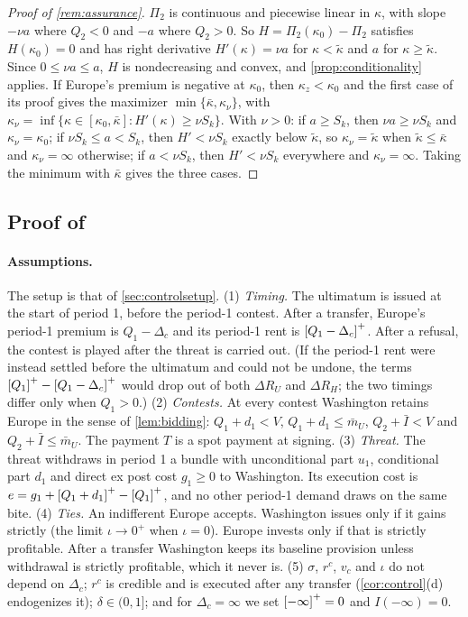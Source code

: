 \begin{proof}[Proof of \cref{rem:assurance}]
$\Pi_2$ is continuous and piecewise linear in $\kappa$, with slope $-\nu a$ where $Q_2<0$ and $-a$ where $Q_2>0$. So $H=\Pi_2(\kappa_0)-\Pi_2$ satisfies $H(\kappa_0)=0$ and has right derivative $H'(\kappa)=\nu a$ for $\kappa<\tilde\kappa$ and $a$ for $\kappa\ge\tilde\kappa$. Since $0\le\nu a\le a$, $H$ is nondecreasing and convex, and \cref{prop:conditionality} applies. If Europe's premium is negative at $\kappa_0$, then $\kappa_z<\kappa_0$ and the first case of its proof gives the maximizer $\min\{\bar\kappa,\kappa_\nu\}$, with $\kappa_\nu=\inf\{\kappa\in[\kappa_0,\bar\kappa]:H'(\kappa)\ge\nu S_k\}$. With $\nu>0$: if $a\ge S_k$, then $\nu a\ge\nu S_k$ and $\kappa_\nu=\kappa_0$; if $\nu S_k\le a<S_k$, then $H'<\nu S_k$ exactly below $\tilde\kappa$, so $\kappa_\nu=\tilde\kappa$ when $\tilde\kappa\le\bar\kappa$ and $\kappa_\nu=\infty$ otherwise; if $a<\nu S_k$, then $H'<\nu S_k$ everywhere and $\kappa_\nu=\infty$. Taking the minimum with $\bar\kappa$ gives the three cases.
\end{proof}

\subsection{Proof of \texorpdfstring{}{preventive control}}

\paragraph{Assumptions.} The setup is that of \cref{sec:controlsetup}. (1) \emph{Timing.} The ultimatum is issued at the start of period 1, before the period-1 contest. After a transfer, Europe's period-1 premium is $Q_1-\Delta_c$ and its period-1 rent is $\left[Q_1-\Delta_c\right]^{+}$. After a refusal, the contest is played after the threat is carried out. (If the period-1 rent were instead settled before the ultimatum and could not be undone, the terms $\left[Q_1\right]^{+}-\left[Q_1-\Delta_c\right]^{+}$ would drop out of both $\Delta R_U$ and $\Delta R_H$; the two timings differ only when $Q_1>0$.) (2) \emph{Contests.} At every contest Washington retains Europe in the sense of \cref{lem:bidding}: $Q_1+d_1<V$, $Q_1+d_1\le\bar m_U$, $Q_2+\bar I<V$ and $Q_2+\bar I\le\bar m_U$. The payment $T$ is a spot payment at signing. (3) \emph{Threat.} The threat withdraws in period 1 a bundle with unconditional part $u_1$, conditional part $d_1$ and direct ex post cost $g_1\ge 0$ to Washington. Its execution cost is $e=g_1+\left[Q_1+d_1\right]^{+}-\left[Q_1\right]^{+}$, and no other period-1 demand draws on the same bite. (4) \emph{Ties.} An indifferent Europe accepts. Washington issues only if it gains strictly (the limit $\iota\to 0^+$ when $\iota=0$). Europe invests only if that is strictly profitable. After a transfer Washington keeps its baseline provision unless withdrawal is strictly profitable, which it never is. (5) $\sigma$, $r^c$, $v_c$ and $\iota$ do not depend on $\Delta_c$; $r^c$ is credible and is executed after any transfer (\cref{cor:control}(d) endogenizes it); $\delta\in(0,1]$; and for $\Delta_c=\infty$ we set $\left[-\infty\right]^{+}=0$ and $I(-\infty)=0$.

